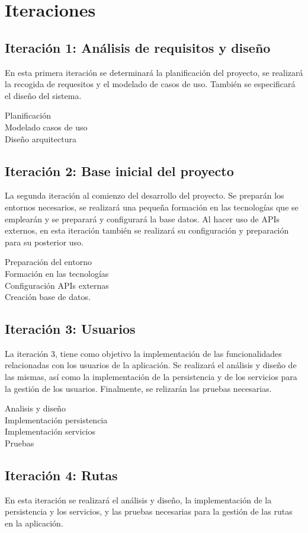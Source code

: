 \section{Iteraciones}
\subsection{Iteración 1: Análisis de requisitos y diseño}

En esta primera iteración se determinará la planificación del proyecto, se realizará la recogida de requesitos y el modelado de casos de uso. También se especificará el diseño del sistema.

Planificación\\
Modelado casos de uso\\
Diseño arquitectura

\subsection{Iteración 2: Base inicial del proyecto}
La segunda iteración al comienzo del desarrollo del proyecto. Se preparán los entornos necesarios, se realizará una pequeña formación en las tecnologías que se emplearán y se preparará y configurará la base datos. Al hacer uso de APIs externos, en esta iteración también se realizará su configuración y preparación para su posterior uso.

Preparación del entorno\\
Formación en las tecnologías\\
Configuración APIs externas\\
Creación base de datos.

\subsection{Iteración 3: Usuarios}
La iteración 3, tiene como objetivo la implementación de las funcionalidades relacionadas con los usuarios de la aplicación. Se realizará el análisis y diseño de las mismas, así como la implementación de la persistencia y de los servicios para la gestión de los usuarios. Finalmente, se relizarán las pruebas necesarias.

Analisis y diseño\\
Implementación persistencia\\
Implementación servicios\\
Pruebas

\subsection{Iteración 4: Rutas}
En esta iteración se realizará el análisis y diseño, la implementación de la persistencia y los servicios, y las pruebas necesarias para la gestión de las rutas en la aplicación.

